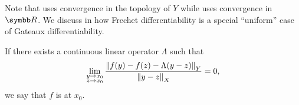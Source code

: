 \begin{definition}
\begin{defenum}
    Note that  uses convergence in the topology of \( Y \) while  uses convergence in \( \BR \). We discuss in  how Frechet differentiability is a special \enquote{uniform} case of Gateaux differentiability.

    \cite[33]{Dontchev2014} If there exists a continuous linear operator \( \Lambda \) such that
    \begin{equation}\label{def:differentiability/strict/condition}
      \lim_{\substack{y \to x_0 \\ z \to x_0}} \frac {\left\Vert f(y) - f(z) - \Lambda (y - z) \right\Vert_Y} {\left\Vert y - z \right\Vert_X} = 0,
    \end{equation}
    we say that \( f \) is  at \( x_0 \).
  \end{defenum}
\end{definition}


